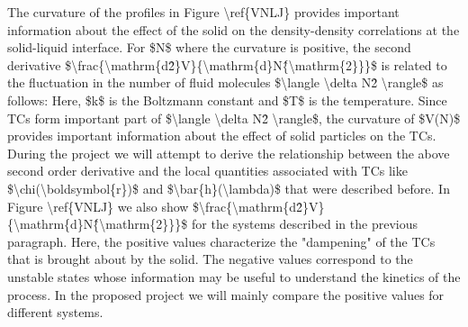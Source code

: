 \par The curvature of the profiles in Figure \textbackslash ref\{VNLJ\} provides important information about the effect of the solid on the density-density correlations at the solid-liquid interface. For \$N\$ where the curvature is positive, the second derivative \$\textbackslash frac\{\textbackslash mathrm\{d\^2\}V\}\{\textbackslash mathrm\{d\}N\^\{\textbackslash mathrm\{2\}\}\}\$ is related to the fluctuation in the number of fluid molecules \$\textbackslash langle \textbackslash delta N\^2 \textbackslash rangle\$ as follows: Here, \$k\$ is the Boltzmann constant and \$T\$ is the temperature. Since TCs form important part of \$\textbackslash langle \textbackslash delta N\^2 \textbackslash rangle\$, the curvature of \$V(N)\$ provides important information about the effect of solid particles on the TCs. During the project we will attempt to derive the relationship between the above second order derivative and the local quantities associated with TCs like \$\textbackslash chi(\textbackslash boldsymbol\{r\})\$ and \$\textbackslash bar\{h\}(\textbackslash lambda)\$ that were described before. In Figure \textbackslash ref\{VNLJ\} we also show \$\textbackslash frac\{\textbackslash mathrm\{d\^2\}V\}\{\textbackslash mathrm\{d\}N\^\{\textbackslash mathrm\{2\}\}\}\$ for the systems described in the previous paragraph. Here, the positive values  characterize the "dampening" of the TCs that is brought about by the solid. The negative values correspond to the unstable states whose information may be useful to understand the kinetics of the process. In the proposed project we will mainly compare the positive values for different systems.
